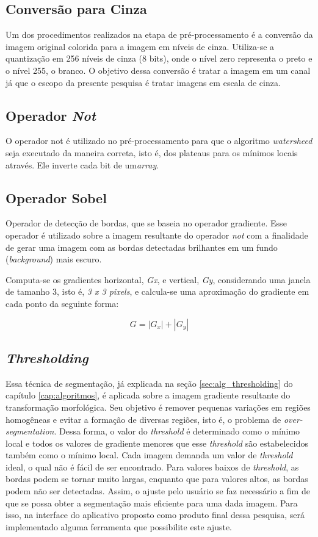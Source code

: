 \subsection*{Conversão para Cinza}
Um dos procedimentos realizados na etapa de pré-processamento é a conversão da imagem original colorida para a imagem em níveis de cinza. Utiliza-se a quantização em 256 níveis de cinza (8 bits), onde o nível zero representa o preto e o nível 255, o branco.
O objetivo dessa conversão é tratar a imagem em um canal já que o escopo da presente pesquisa é tratar imagens em escala de cinza.

\subsection*{Operador \textit{Not}}
O operador not é utilizado no pré-processamento para que o algoritmo \textit{watersheed } seja executado da maneira correta, isto é, dos plateaus para os mínimos locais através. Ele inverte cada bit de um\textit{array}.

\subsection*{Operador Sobel}
Operador de detecção de bordas, que se baseia no operador gradiente. Esse operador é utilizado sobre a imagem resultante do operador \textit{not} com a finalidade de gerar uma imagem com as bordas detectadas brilhantes em um fundo (\textit{background}) mais escuro.

Computa-se os gradientes horizontal, \textit{Gx}, e vertical, \textit{Gy}, considerando uma janela de tamanho 3, isto é, \textit{3 x 3 pixels}, e calcula-se uma aproximação do gradiente em cada ponto da seguinte forma:

\[G = |G_{x}| + |G_{y}|\]


\subsection*{\textit{Thresholding}}
Essa técnica de segmentação, já explicada na seção \ref{sec:alg_thresholding} do capítulo \ref{cap:algoritmos}, é aplicada sobre a imagem gradiente resultante do transformação morfológica. Seu objetivo é remover pequenas variações em regiões homogêneas e evitar a formação de diversas regiões, isto é, o problema de \textit{over-segmentation}. Dessa forma, o valor do \textit{threshold} é determinado como o mínimo local e todos os valores de gradiente menores que esse \textit{threshold} são estabelecidos também como o mínimo local.
Cada imagem demanda um valor de \textit{threshold} ideal, o qual não é fácil de ser encontrado. Para valores baixos de \textit{threshold}, as bordas podem se tornar muito largas, enquanto que para valores altos, as bordas podem não ser detectadas.
Assim, o ajuste pelo usuário se faz necessário a fim de que se possa obter a segmentação mais eficiente para uma dada imagem. Para isso, na interface do aplicativo proposto como produto final dessa pesquisa, será implementado alguma ferramenta que possibilite este ajuste.

